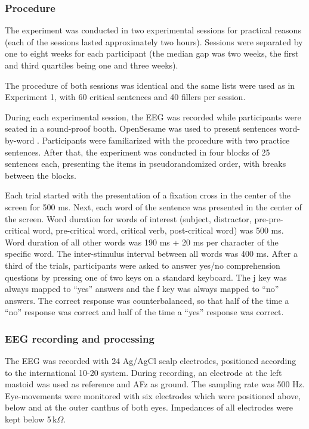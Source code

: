 \documentclass[review,preprint,12pt,authoryear,floatsintext]{elsarticle}
\begin{document}
\subsubsection*{Procedure}
The experiment was conducted in two experimental sessions for practical reasons (each of the sessions lasted approximately two hours). Sessions were separated by one to eight weeks for each participant (the median gap was two weeks, the first and third quartiles being one and three weeks). {The procedure of both sessions was identical and the same lists were used as in Experiment 1, with 60 critical sentences and 40 fillers per session.

During each experimental session, the EEG was recorded while participants were seated in a sound-proof booth. OpenSesame was used to present sentences word-by-word \citep{opensesame}. Participants were familiarized with the procedure with two practice sentences. After that, the experiment was conducted in four blocks of 25 sentences each, presenting the items in pseudorandomized order, with breaks between the blocks.}\label{fillers2} Each trial started with the presentation of a fixation cross in the center of the screen for 500 ms. Next, each word of the sentence was presented in the center of the screen. Word duration for words of interest (subject, distractor, pre-pre-critical word, pre-critical word, critical verb, post-critical word) was 500 ms. Word duration of all other words was 190 ms + 20 ms per character of the specific word. The inter-stimulus interval between all words was 400 ms. After a third of the trials, participants were asked to answer yes/no comprehension questions by pressing one of two keys on a standard keyboard. The j key was always mapped to ``yes'' answers and the f key was always mapped to ``no'' answers. The correct response was counterbalanced, so that half of the time a ``no'' response was correct and half of the time a ``yes'' response was correct.

\subsubsection*{EEG recording and processing}
The EEG was recorded with 24 Ag/AgCl scalp electrodes, positioned according to the international 10-20 system. During recording, an electrode at the left mastoid was used as reference and AFz as ground. The sampling rate was 500 Hz. Eye-movements were monitored with six electrodes which were positioned above, below and at the outer canthus of both eyes. Impedances of all electrodes were kept below 5\,k$\Omega$.
\end{document}
